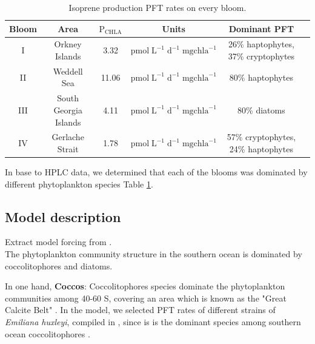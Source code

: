\documentclass[draft,linenumbers]{agujournal}
\begin{document}
\begin{center}
\begin{table}[b!]
\caption{Isoprene production PFT rates on every bloom.}
\centering
\label{tab:pegblooms}
\begin{tabular}[ht]{ c|c|c|c|c|c } 

 \textbf{Bloom} & \textbf{Area} & \textbf{ $\mathrm{P_{CHLA}}$ }& \textbf{Units} & \textbf{Dominant PFT} \\\hline
 I &  Orkney Islands & 3.32   &  $\mathrm{pmol} \; \mathrm{L}^{\mathrm{-1}} \; \mathrm{d}^{\mathrm{-1}}\; \mathrm{mg chla}^{\mathrm{-1}}$& 26\% haptophytes, 37\% cryptophytes  \\
II &   Weddell Sea&  11.06   &  $\mathrm{pmol} \; \mathrm{L}^{\mathrm{-1}} \; \mathrm{d}^{\mathrm{-1}}\; \mathrm{mg chla}^{\mathrm{-1}}$ &  80\% haptophytes\\
 III &  South Georgia Islands & 4.11   &  $\mathrm{pmol} \; \mathrm{L}^{\mathrm{-1}} \; \mathrm{d}^{\mathrm{-1}}\; \mathrm{mg chla}^{\mathrm{-1}}$  & 80\% diatoms  \\
 IV & Gerlache Strait & 1.78   &  $\mathrm{pmol} \; \mathrm{L}^{\mathrm{-1}} \; \mathrm{d}^{\mathrm{-1}}\; \mathrm{mg chla}^{\mathrm{-1}}$  &  57\% cryptophytes, 24\% haptophytes\\

\end{tabular}
\end{table}
\end{center}

In base to HPLC data, we determined that each of the blooms was dominated by different phytoplankton species Table \ref{tab:pegblooms}.

\subsection{Model description}

Extract model forcing from \citep{Nissen2018}.\\

The phytoplankton community structure in the southern ocean  is dominated by coccolitophores and diatoms.

In one hand, \textbf{Coccos}: Coccolitophores species dominate the phytoplankton communities among 40-60 S, covering an area which is known as the "Great Calcite Belt" \citep{balch2011contribution}. In the model, we selected PFT rates of different strains of \textit{Emiliana huxleyi}, compiled in \citep{booge2016can}, since is is the dominant species among southern ocean coccolitophores \citep{Saavedra-Pellitero2014, balch2016factors}.
\end{document}
